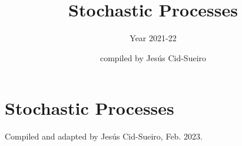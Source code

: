 \documentclass[graybox,sectrefs]{svmono_mod}
\begin{document}
\author{compiled by Jes\'us Cid-Sueiro}
\title{Stochastic Processes}
\subtitle{Year 2021-22}





%
%
%
%

%

\chapter{Stochastic Processes}

\vspace{11cm}
Compiled and adapted by Jesús Cid-Sueiro, Feb. 2023.

\mainmatter%

\tableofcontents




%
%
\end{document}
